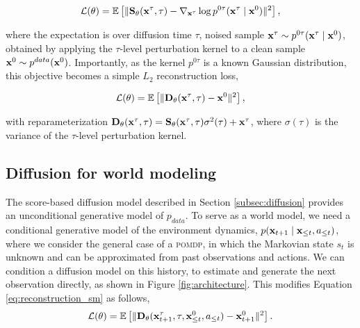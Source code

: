 \begin{equation}
\label{eq:denoising_sm}
    \mathcal{L}(\theta) = \mathbb{E} \left[ \Vert \mathbf{S}_\theta(\mathbf{x}^\tau, \tau) - \nabla_{\mathbf{x}^\tau} \log p^{0\tau}(\mathbf{x}^\tau \mid \mathbf{x}^0) \Vert^2 \right],
\end{equation}

where the expectation is over diffusion time $\tau$, noised sample $\mathbf{x}^\tau \sim p^{0\tau}(\mathbf{x}^\tau \mid \mathbf{x}^0)$, obtained by applying the $\tau$-level perturbation kernel to a clean sample $\mathbf{x}^0 \sim p^{data}(\mathbf{x}^0)$. Importantly, as the kernel $p^{0\tau}$ is a known Gaussian distribution, this objective becomes a simple $L_2$ reconstruction loss,

\begin{equation}
\label{eq:reconstruction_sm}
     \mathcal{L}(\theta) = \mathbb{E} \left[ \Vert \mathbf{D}_\theta(\mathbf{x}^\tau, \tau) - \mathbf{x}^{0} \Vert^2 \right],
\end{equation}

with reparameterization $\mathbf{D}_\theta(\mathbf{x}^\tau, \tau) = \mathbf{S}_\theta(\mathbf{x}^\tau, \tau) \sigma^2(\tau) + \mathbf{x}^\tau$, where $\sigma(\tau)$ is the variance of the $\tau$-level perturbation kernel.



\subsection{Diffusion for world modeling}
\label{subsec:dwm_training}


The score-based diffusion model described in Section \ref{subsec:diffusion} provides an unconditional generative model of $p_{data}$. To serve as a world model, we need a conditional generative model of the environment dynamics, $p(\mathbf{x}_{t+1} \mid \mathbf{x}_{\le t}, a_{\le t})$, where we consider the general case of a \textsc{pomdp}, in which the Markovian state $s_t$ is unknown and can be approximated from past observations and actions. We can condition a diffusion model on this history, to estimate and generate the next observation directly, as shown in Figure \ref{fig:architecture}. This modifies Equation \ref{eq:reconstruction_sm} as follows,
\begin{equation}
\label{eq:denoising_sm_conditional}
     \mathcal{L}(\theta) = \mathbb{E} \left[ \Vert \mathbf{D}_\theta(\mathbf{x}_{t+1}^\tau, \tau, \mathbf{x}_{\le t}^0, a_{\le t}) - \mathbf{x}_{t+1}^0 \Vert^2 \right].
\end{equation}
\vspace{-5mm}

